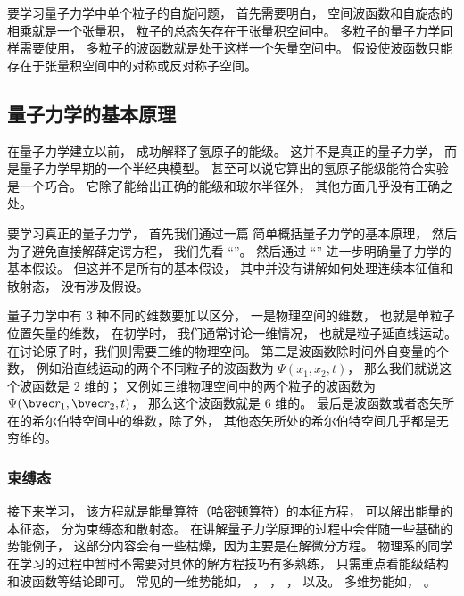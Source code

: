 要学习量子力学中单个粒子的自旋问题， 首先需要明白， 空间波函数和自旋态的相乘就是一个张量积， 粒子的总态矢存在于张量积空间中。 多粒子的量子力学同样需要使用， 多粒子的波函数就是处于这样一个矢量空间中。 假设使波函数只能存在于张量积空间中的对称或反对称子空间。

\subsection{量子力学的基本原理}

在量子力学建立以前， 成功解释了氢原子的能级。 这并不是真正的量子力学， 而是量子力学早期的一个半经典模型。 甚至可以说它算出的氢原子能级能符合实验是一个巧合。 它除了能给出正确的能级和玻尔半径外， 其他方面几乎没有正确之处。

要学习真正的量子力学， 首先我们通过一篇 简单概括量子力学的基本原理， 然后为了避免直接解薛定谔方程， 我们先看 “”。 然后通过 “” 进一步明确量子力学的基本假设。 但这并不是所有的基本假设， 其中并没有讲解如何处理连续本征值和散射态， 没有涉及假设。

量子力学中有 3 种不同的维数要加以区分， 一是物理空间的维数， 也就是单粒子位置矢量的维数， 在初学时， 我们通常讨论一维情况， 也就是粒子延直线运动。 在讨论原子时，我们则需要三维的物理空间。 第二是波函数除时间外自变量的个数， 例如沿直线运动的两个不同粒子的波函数为 $\Psi(x_1,x_2,t)$， 那么我们就说这个波函数是 2 维的； 又例如三维物理空间中的两个粒子的波函数为 $\Psi(\bvec r_1, \bvec r_2, t)$， 那么这个波函数就是 6 维的。 最后是波函数或者态矢所在的希尔伯特空间中的维数，除了外， 其他态矢所处的希尔伯特空间几乎都是无穷维的。

\subsubsection{束缚态}
接下来学习， 该方程就是能量算符（哈密顿算符）的本征方程， 可以解出能量的本征态， 分为束缚态和散射态。 在讲解量子力学原理的过程中会伴随一些基础的势能例子， 这部分内容会有一些枯燥，因为主要是在解微分方程。 物理系的同学在学习的过程中暂时不需要对具体的解方程技巧有多熟练， 只需重点看能级结构和波函数等结论即可。 常见的一维势能如， ， ， ， 以及。 多维势能如， 。

